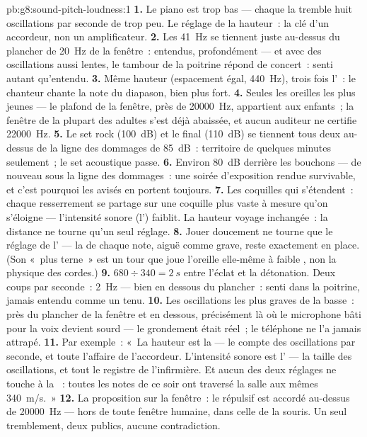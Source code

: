 \begin{solution}{pb:g8:sound-pitch-loudness:1}
\textbf{1.} Le piano est trop bas --- chaque la tremble huit
oscillations par seconde de trop peu. Le réglage de la hauteur~: la
clé d'un accordeur, non un amplificateur.
\textbf{2.} Les \qty{41}{Hz} se tiennent juste au-dessus du plancher
de \qty{20}{Hz} de la fenêtre~: entendus, profondément --- et avec des
oscillations aussi lentes, le tambour de la poitrine répond de
concert~: senti autant qu'entendu.
\textbf{3.} Même hauteur (espacement égal, \qty{440}{Hz}), trois fois
l'~: le chanteur chante la note du diapason, bien plus fort.
\textbf{4.} Seules les oreilles les plus jeunes --- le plafond de la
fenêtre, près de \qty{20000}{Hz}, appartient aux enfants~; la fenêtre
de la plupart des adultes s'est déjà abaissée, et aucun auditeur ne
certifie \qty{22000}{Hz}.
\textbf{5.} Le set rock (\qty{100}{dB}) et le final (\qty{110}{dB})
se tiennent tous deux au-dessus de la ligne des dommages de
\qty{85}{dB}~: territoire de quelques minutes seulement~; le set
acoustique passe.
\textbf{6.} Environ \qty{80}{dB} derrière les bouchons --- de nouveau
sous la ligne des dommages~: une soirée d'exposition rendue
survivable, et c'est pourquoi les avisés en portent toujours.
\textbf{7.} Les coquilles qui s'étendent~: chaque resserrement se
partage sur une coquille plus vaste à mesure qu'on s'éloigne ---
l'intensité sonore (l') faiblit. La hauteur voyage
inchangée~: la distance ne tourne qu'un seul réglage.
\textbf{8.} Jouer doucement ne tourne que le réglage de l'
--- la  de chaque note, aiguë comme grave, reste exactement
en place. (Son «~plus terne~» est un tour que joue l'oreille
elle-même à faible , non la physique des cordes.)
\textbf{9.} $680 \div 340 = \qty{2}{s}$ entre l'éclat et la
détonation. Deux coups par seconde~: \qty{2}{Hz} --- bien en dessous
du plancher~: senti dans la poitrine, jamais entendu comme un 
tenu.
\textbf{10.} Les oscillations les plus graves de la basse~: près du
plancher de la fenêtre et en dessous, précisément là où le microphone
bâti pour la voix devient sourd --- le grondement était réel~; le
téléphone ne l'a jamais attrapé.
\textbf{11.} Par exemple~: «~La hauteur est la  --- le
compte des oscillations par seconde, et toute l'affaire de
l'accordeur. L'intensité sonore est l' --- la taille des
oscillations, et tout le registre de l'infirmière. Et aucun des deux
réglages ne touche à la ~: toutes les notes de ce soir ont
traversé la salle aux mêmes \qty{340}{m/s}.~»
\textbf{12.} La proposition sur la fenêtre~: le répulsif est accordé
au-dessus de \qty{20000}{Hz} --- hors de toute fenêtre humaine, dans
celle de la souris. Un seul tremblement, deux publics, aucune
contradiction.
\end{solution}
